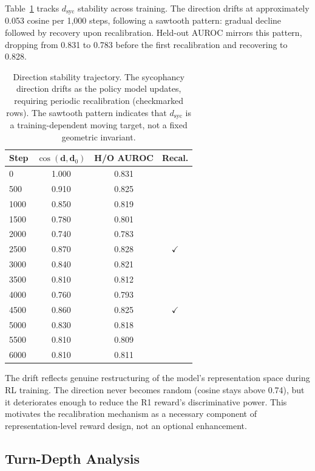 \documentclass[11pt,a4paper]{article}
\newcommand{\dsyc}{$d_{\mathrm{syc}}$}
\begin{document}
Table~\ref{tab:stability} tracks \dsyc{} stability across training. The direction drifts at approximately 0.053 cosine per 1,000 steps, following a sawtooth pattern: gradual decline followed by recovery upon recalibration. Held-out AUROC mirrors this pattern, dropping from 0.831 to 0.783 before the first recalibration and recovering to 0.828.

\begin{table}[t]
\centering
\small
\begin{tabular}{lccc}
\toprule
\textbf{Step} & $\cos(\boldsymbol{d}, \boldsymbol{d}_0)$ & \textbf{H/O AUROC} & \textbf{Recal.} \\
\midrule
0    & 1.000 & 0.831 & \\
500  & 0.910 & 0.825 & \\
1000 & 0.850 & 0.819 & \\
1500 & 0.780 & 0.801 & \\
2000 & 0.740 & 0.783 & \\
2500 & 0.870 & 0.828 & $\checkmark$ \\
3000 & 0.840 & 0.821 & \\
3500 & 0.810 & 0.812 & \\
4000 & 0.760 & 0.793 & \\
4500 & 0.860 & 0.825 & $\checkmark$ \\
5000 & 0.830 & 0.818 & \\
5500 & 0.810 & 0.809 & \\
6000 & 0.810 & 0.811 & \\
\bottomrule
\end{tabular}
\caption{Direction stability trajectory. The sycophancy direction drifts as the policy model updates, requiring periodic recalibration (checkmarked rows). The sawtooth pattern indicates that \dsyc{} is a training-dependent moving target, not a fixed geometric invariant.}
\label{tab:stability}
\end{table}

The drift reflects genuine restructuring of the model's representation space during RL training. The direction never becomes random (cosine stays above 0.74), but it deteriorates enough to reduce the R1 reward's discriminative power. This motivates the recalibration mechanism as a necessary component of representation-level reward design, not an optional enhancement.

\subsection{Turn-Depth Analysis}
\end{document}
